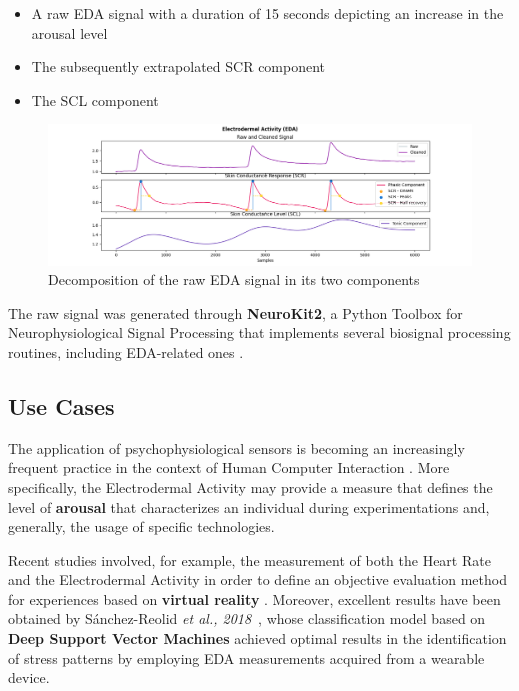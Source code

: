\begin{itemize}
    \item A raw EDA signal with a duration of 15 seconds depicting an increase in the arousal level
    \item The subsequently extrapolated SCR component
    \item The SCL component
\end{itemize}

\begin{figure}[h]
    \centering
    \includegraphics[width=\textwidth]{./images/eda-simulation.png}
    \caption{Decomposition of the raw EDA signal in its two components}
    \label{fig:eda-example}
\end{figure}

The raw signal was generated through \textbf{NeuroKit2}, a Python Toolbox for Neurophysiological Signal Processing that implements several biosignal processing routines, including EDA-related ones \cite{neurokit}.

\subsection{Use Cases}\label{subsec:eda-usecases}

The application of psychophysiological sensors is becoming an increasingly frequent practice in the context of Human Computer Interaction \cite{eda-hci}. More specifically, the Electrodermal Activity may provide a measure that defines the level of \textbf{arousal} that characterizes an individual during experimentations and, generally, the usage of specific technologies.

Recent studies involved, for example, the measurement of both the Heart Rate and the Electrodermal Activity in order to define an objective evaluation method for experiences based on \textbf{virtual reality} \cite{eda-vr}. Moreover, excellent results have been obtained by Sánchez-Reolid \textit{et al., 2018}~\cite{edasvm}, whose classification model based on \textbf{Deep Support Vector Machines} achieved optimal results in the identification of stress patterns by employing EDA measurements acquired from a wearable device.

